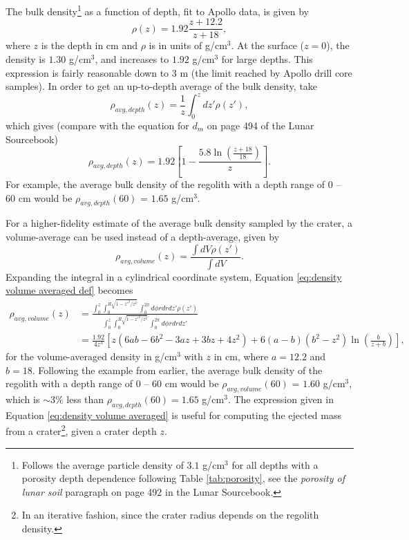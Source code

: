 \documentclass{article}
\begin{document}
The bulk density\footnote{Follows the average particle density of $3.1$ g/cm$^3$ for all depths with a porosity depth dependence following Table \ref{tab:porosity}, see the \textit{porosity of lunar soil} paragraph on page 492 in the Lunar Sourcebook.} as a function of depth, fit to Apollo data, is given by
\begin{equation}\label{eq:regolith density vs depth}
\rho(z) = 1.92\frac{z+12.2}{z+18},
\end{equation}
where $z$ is the depth in cm and $\rho$ is in units of g/cm$^3$. At the surface ($z=0$), the density is $1.30$ g/cm$^3$, and increases to $1.92$ g/cm$^3$ for large depths. This expression is fairly reasonable down to $3$ m (the limit reached by Apollo drill core samples). In order to get an up-to-depth average of the bulk density, take
\begin{equation}
\rho_{avg, depth}(z) = \frac{1}{z}\int_{0}^{z}dz'\rho(z'), 
\end{equation}
which gives (compare with the equation for $d_m$ on page 494 of the Lunar Sourcebook)
\begin{equation}\label{eq:density depth averaged}
\rho_{avg, depth}(z) = 1.92\left[1 - \frac{5.8\ln\left(\frac{z + 18}{18}\right)}{z}\right].
\end{equation}
For example, the average bulk density of the regolith with a depth range of $0$ -- $60$ cm would be $\rho_{avg, depth}(60)$ = $1.65$ g/cm$^3$.

For a higher-fidelity estimate of the average bulk density sampled by the crater, a volume-average can be used instead of a depth-average, given by
\begin{equation}\label{eq:density volume averaged def}
\rho_{avg, volume}(z) = \frac{\int dV \rho(z')}{\int dV}.
\end{equation}
Expanding the integral in a cylindrical coordinate system, Equation \eqref{eq:density volume averaged def} becomes
\begin{align}
\rho_{avg, volume}(z) &= \frac{\int_{0}^{z}\int_{0}^{R\sqrt{1-z'^2/z^2}}\int_{0}^{2\pi}d\phi rdr dz' \rho(z')}{\int_{0}^{z}\int_{0}^{R\sqrt{1-z'^2/z^2}}\int_{0}^{2\pi}d\phi rdr dz'}\\\label{eq:density volume averaged}
&= \frac{1.92}{4z^3}\left[z(6ab - 6b^2 - 3az + 3bz + 4z^2) + 6(a-b)(b^2-z^2)\ln\left(\frac{b}{z + b}\right)\right],
\end{align}
for the volume-averaged density in g/cm$^3$ with $z$ in cm, where $a = 12.2$ and $b = 18$. Following the example from earlier, the average bulk density of the regolith with a depth range of $0$ -- $60$ cm would be $\rho_{avg, volume}(60)$ = $1.60$ g/cm$^3$, which is $\sim 3\%$ less than $\rho_{avg, depth}(60) = 1.65$ g/cm$^3$. The expression given in Equation \eqref{eq:density volume averaged} is useful for computing the ejected mass from a crater\footnote{In an iterative fashion, since the crater radius depends on the regolith density.}, given a crater depth $z$.
\end{document}
